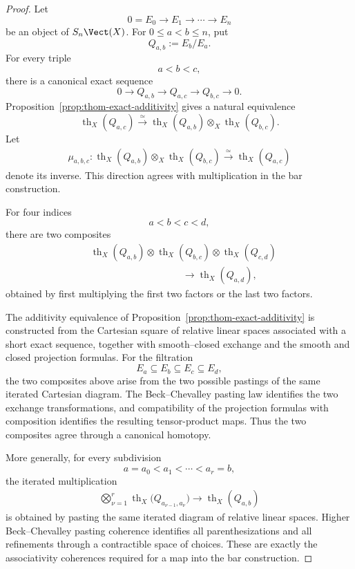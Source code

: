 \begin{proof}
Let
\[
    0=E_0\longrightarrow E_1\longrightarrow\cdots\longrightarrow E_n
\]
be an object of \(S_n\Vect(X)\).  For \(0\leq a<b\leq n\), put
\[
    Q_{a,b}:=E_b/E_a.
\]
For every triple
\[
    a<b<c,
\]
there is a canonical exact sequence
\[
    0
    \longrightarrow
    Q_{a,b}
    \longrightarrow
    Q_{a,c}
    \longrightarrow
    Q_{b,c}
    \longrightarrow
    0.
\]
Proposition~\ref{prop:thom-exact-additivity} gives a natural equivalence
\[
    \operatorname{th}_X(Q_{a,c})
    \xrightarrow{\simeq}
    \operatorname{th}_X(Q_{a,b})
    \otimes_X
    \operatorname{th}_X(Q_{b,c}).
\]
Let
\[
\begin{aligned}
    \mu_{a,b,c}:
    \operatorname{th}_X(Q_{a,b})
    \otimes_X
    \operatorname{th}_X(Q_{b,c})
    \xrightarrow{\simeq}
    \operatorname{th}_X(Q_{a,c})
\end{aligned}
\]
denote its inverse.  This direction agrees with multiplication in the bar
construction.

For four indices
\[
    a<b<c<d,
\]
there are two composites
\[
\begin{aligned}
    &
    \operatorname{th}_X(Q_{a,b})
    \otimes
    \operatorname{th}_X(Q_{b,c})
    \otimes
    \operatorname{th}_X(Q_{c,d}) \\
    &\hspace{4cm}
    \longrightarrow
    \operatorname{th}_X(Q_{a,d}),
\end{aligned}
\]
obtained by first multiplying the first two factors or the last two factors.

The additivity equivalence of
Proposition~\ref{prop:thom-exact-additivity} is constructed from the
Cartesian square of relative linear spaces associated with a short exact
sequence, together with smooth--closed exchange and the smooth and closed
projection formulas.  For the filtration
\[
    E_a\subseteq E_b\subseteq E_c\subseteq E_d,
\]
the two composites above arise from the two possible pastings of the same
iterated Cartesian diagram.  The Beck--Chevalley pasting law identifies the
two exchange transformations, and compatibility of the projection formulas
with composition identifies the resulting tensor-product maps.  Thus the
two composites agree through a canonical homotopy.

More generally, for every subdivision
\[
    a=a_0<a_1<\cdots<a_r=b,
\]
the iterated multiplication
\[
\begin{aligned}
    \bigotimes_{\nu=1}^r
    \operatorname{th}_X
    \bigl(
      Q_{a_{\nu-1},a_\nu}
    \bigr)
    \longrightarrow
    \operatorname{th}_X(Q_{a,b})
\end{aligned}
\]
is obtained by pasting the same iterated diagram of relative linear spaces.
Higher Beck--Chevalley pasting coherence identifies all parenthesizations
and all refinements through a contractible space of choices.  These are
exactly the associativity coherences required for a map into the bar
construction.


\end{proof}
